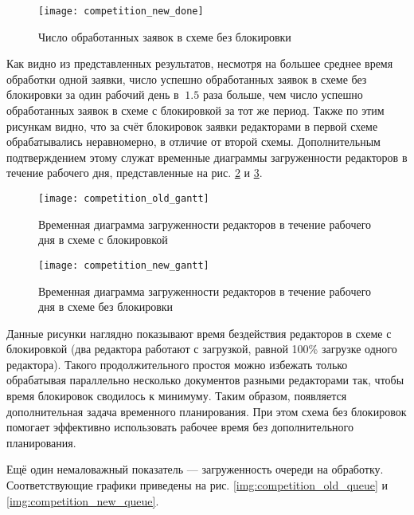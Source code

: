 \begin{figure}[h!]
  \centering
  \texttt{[image: competition\_new\_done]}
  \caption{Число обработанных заявок в схеме без блокировки}
  \label{img:competition_new_done}
\end{figure}

\vspace{\baselineskip}
Как видно из представленных результатов, несмотря на б\textit{о}льшее среднее время обработки одной заявки, число успешно обработанных заявок в схеме без блокировки за один рабочий день в $~1.5$ раза больше, чем число успешно обработанных заявок в схеме с блокировкой за тот же период. Также по этим рисункам видно, что за счёт блокировок заявки редакторами в первой схеме обрабатывались неравномерно, в отличие от второй схемы. Дополнительным подтверждением этому служат временные диаграммы загруженности редакторов в течение рабочего дня, представленные на рис. \ref{img:competition_old_gantt} и \ref{img:competition_new_gantt}.

\begin{figure}[h!]
  \centering
  \texttt{[image: competition\_old\_gantt]}
  \caption{Временная диаграмма загруженности редакторов в течение рабочего дня в схеме с блокировкой}
  \label{img:competition_old_gantt}
\end{figure}

\begin{figure}[h!]
  \centering
  \texttt{[image: competition\_new\_gantt]}
  \caption{Временная диаграмма загруженности редакторов в течение рабочего дня в схеме без блокировки}
  \label{img:competition_new_gantt}
\end{figure}

\vspace{\baselineskip}
Данные рисунки наглядно показывают время бездействия редакторов в схеме с блокировкой (два редактора работают с загрузкой, равной 100\% загрузке одного редактора). Такого продолжительного простоя можно избежать только обрабатывая параллельно несколько документов разными редакторами так, чтобы время блокировок сводилось к минимуму. Таким образом, появляется дополнительная задача временн\textit{о}го планирования. При этом схема без блокировок помогает эффективно использовать рабочее время без дополнительного планирования.

\vspace{\baselineskip}
Ещё один немаловажный показатель --- загруженность очереди на обработку. Соответствующие графики приведены на рис. \ref{img:competition_old_queue} и \ref{img:competition_new_queue}.

